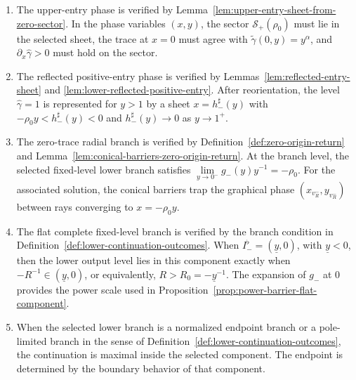 \documentclass{amsart}
\theoremstyle{plain}
\theoremstyle{mainintrothm}
\theoremstyle{definition}
\begin{document}
\begin{enumerate}[label=\textup{(\alph*)}]
	\item The upper-entry phase is verified by
	Lemma~\ref{lem:upper-entry-sheet-from-zero-sector}.  In the phase variables
	$(x,y)$, the sector $\mathcal S_+(\rho_0)$ must lie in the selected sheet, the trace at $x=0$ must agree with
	$\widetilde\gamma(0,y)=y^\alpha$, and
	$\partial_x\widehat\gamma>0$ must hold on the sector.
	
	\item The reflected positive-entry phase is verified by
	Lemmas~\ref{lem:reflected-entry-sheet} and
	\ref{lem:lower-reflected-positive-entry}.  After reorientation, the level
	$\widehat\gamma=1$ is represented for $y>1$ by a sheet
	$x=h_-^\sharp(y)$ with
	$-\rho_0y<h_-^\sharp(y)<0$ and
	$h_-^\sharp(y)\to0$ as $y\to1^+$.
	
	\item The zero-trace radial branch is verified by
	Definition~\ref{def:zero-origin-return} and
	Lemma~\ref{lem:conical-barriers-zero-origin-return}.  At the branch level,
	the selected fixed-level lower branch satisfies $\lim\limits_{y\to0^-}g_-(y)y^{-1}=-\rho_0$. For the associated solution, the conical barriers trap the graphical phase
	$(x_{v_R^-},y_{v_R^-})$ between rays converging to
	$x=-\rho_0y$.
	
	\item The flat complete fixed-level branch is verified by the branch
	condition in Definition~\ref{def:lower-continuation-outcomes}.  When
	$I_-^\flat=(\underline y,0)$, with $\underline y<0$, then the lower output
	level lies in this component exactly when $-R^{-1}\in(\underline y,0)$, or equivalently,  $R>R_0=-\underline{y}^{-1}$. The expansion of $g_-$ at $0$ provides the power scale used in
	Proposition~\ref{prop:power-barrier-flat-component}.
	
	\item When the selected lower branch is a normalized endpoint branch or a
	pole-limited branch in the sense of
	Definition~\ref{def:lower-continuation-outcomes}, the continuation is
	maximal inside the selected component.  The endpoint is determined by the
	boundary behavior of that component.
\end{enumerate}
\end{document}
